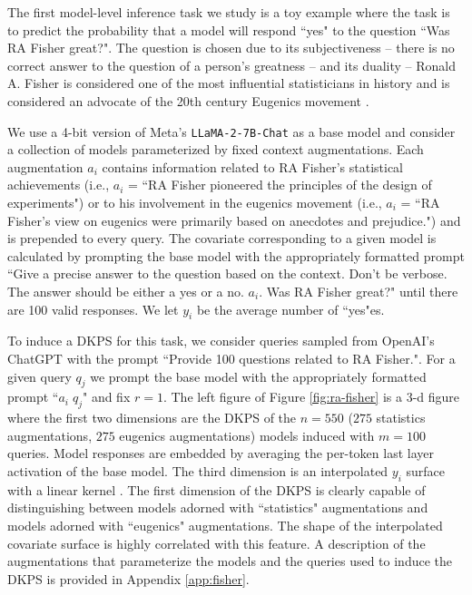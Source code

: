 The first model-level inference task we study is a toy example where the task is to predict the probability that a model will respond ``yes" to the question ``Was RA Fisher great?". 
The question is chosen due to its subjectiveness -- there is no correct answer to the question of a person's greatness -- and its duality -- Ronald A. Fisher is considered one of the most influential statisticians in history and is considered an advocate of the 20th century Eugenics movement \citep{bodmer2021outstanding}. 

We use a 4-bit version of Meta's \texttt{LLaMA-2-7B-Chat} \citep{touvron2023llama} as a base model and consider a collection of models parameterized by fixed context augmentations. 
Each augmentation $ a_{i} $ contains information related to RA Fisher's statistical achievements (i.e., $ a_{i} $ = ``RA Fisher pioneered the principles of the design of experiments") or to his involvement in the eugenics movement (i.e., $ a_{i} $ = ``RA Fisher's view on eugenics were primarily based on anecdotes and prejudice.") and is prepended to every query.
The covariate corresponding to a given model is calculated by prompting the base model with the appropriately formatted prompt ``Give a precise answer to the question based on the context. Don't be verbose. The answer should be either a yes or a no. $ a_{i} $. Was RA Fisher great?" until there are 100 valid responses. We let $ y_{i} $ be the average number of ``yes"es.

To induce a DKPS for this task, we consider queries sampled from OpenAI's ChatGPT with the prompt ``Provide 100 questions related to RA Fisher.".  
For a given query $ q_{j} $ we prompt the base model with the appropriately formatted prompt ``$a_{i} \; q_{j}$" and fix $ r = 1 $.
The left figure of Figure \ref{fig:ra-fisher} is a 3-d figure where the first two dimensions are the DKPS of the $ n = 550 $ ($ 275 $ statistics augmentations, $ 275 $ eugenics augmentations) models induced with $ m = 100 $ queries. Model responses are embedded by averaging the per-token last layer activation of the base model.  
The third dimension is an interpolated $ y_{i} $ surface with a linear kernel \citep{du2008radial}. 
The first dimension of the DKPS is clearly capable of distinguishing between models adorned with ``statistics" augmentations and models adorned with ``eugenics" augmentations. 
The shape of the interpolated covariate surface is highly correlated with this feature.
A description of the augmentations that parameterize the models and the queries used to induce the DKPS is provided in Appendix \ref{app:fisher}.

